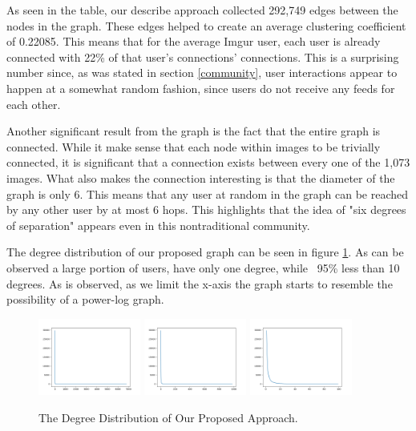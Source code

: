 \documentclass{article}
\begin{document}
As seen in the table, our describe approach collected 292,749 edges between the nodes in the graph. These edges helped to create an average clustering coefficient of 0.22085. This means that for the average Imgur user, each user is already connected with 22\% of that user's connections' connections. This is a surprising number since, as was stated in section \ref{community}, user interactions appear to happen at a somewhat random fashion, since users do not receive any feeds for each other. 
\par Another significant result from the graph is the fact that the entire graph is connected. While it make sense that each node within images to be trivially connected, it is significant that a connection exists between every one of the 1,073 images. What also makes the connection interesting is that the diameter of the graph is only 6. This means that any user at random in the graph can be reached by any other user by at most 6 hops. This highlights that the idea of "six degrees of separation" appears even in this nontraditional community. 
\par The degree distribution of our proposed graph can be seen in figure \ref{degreeDist}. As can be observed a large portion of users, have only one degree, while ~95\% less than 10 degrees. As is observed, as we limit the x-axis the graph starts to resemble the possibility of a power-log graph. 
\begin{figure}[h]
    \centering
    \includegraphics[width=0.3\textwidth]{DegreeDistribution.png}
    \includegraphics[width=0.3\textwidth]{DegreeDistribution1000.png}
    \includegraphics[width=0.3\textwidth]{DegreeDistribution100.png}
    \caption{The Degree Distribution of Our Proposed Approach.}
    \label{degreeDist}
\end{figure}
\end{document}
